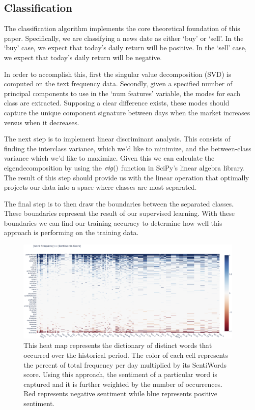 \documentclass{article}
\begin{document}
\subsection{Classification}
The classification algorithm implements the core theoretical foundation of this paper.  Specifically, we are classifying a news date as either `buy' or `sell'.  In the `buy' case, we expect that today's daily return will be positive.  In the `sell' case, we expect that today's daily return will be negative. 
 
In order to accomplish this, first the singular value decomposition (SVD) is computed on the text frequency data.  Secondly, given a specified number of principal components to use in the `num features' variable, the modes for each class are extracted.  Supposing a clear difference exists, these modes should capture the unique component signature between days when the market increases versus when it decreases.

The next step is to implement linear discriminant analysis.  This consists of finding the interclass variance, which we’d like to minimize, and the between-class variance which we’d like to maximize.  Given this we can calculate the eigendecomposition by using the ${\it eig()}$ function in SciPy's linear algebra library.  The result of this step should provide us with the linear operation that optimally projects our data into a space where classes are most separated.

The final step is to then draw the boundaries between the separated classes.  These boundaries represent the result of our supervised learning.  With these boundaries we can find our training accuracy to determine how well this approach is performing on the training data.


\begin{figure}
    \centering
    \includegraphics[width=1.0\linewidth]{Figures/0FrequencyMap.png}
    \caption{This heat map represents the dictionary of distinct words that occurred over the historical period.  The color of each cell represents the percent of total frequency per day multiplied by its SentiWords score.  Using this approach, the sentiment of a particular word is captured and it is further weighted by the number of occurrences.  Red represents negative sentiment while blue represents positive sentiment.}
    \label{fig:FreqHeat}
\end{figure}
\end{document}
